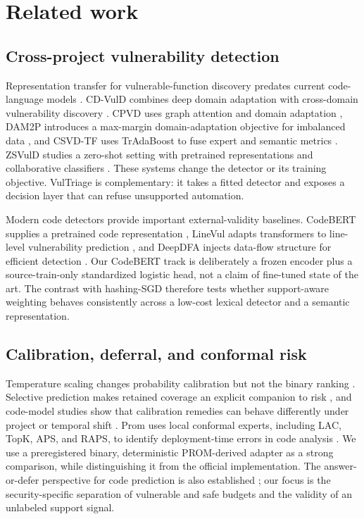 \documentclass[research]{fcs}
\newcommand{\method}{VulTriage\xspace}
\begin{document}
\section{Related work}

\subsection{Cross-project vulnerability detection}

Representation transfer for vulnerable-function discovery predates current code-language models \cite{lin2018transfer}. CD-VulD combines deep domain adaptation with cross-domain vulnerability discovery \cite{liu2022cdvuld}. CPVD uses graph attention and domain adaptation \cite{zhang2023cpvd}, DAM2P introduces a max-margin domain-adaptation objective for imbalanced data \cite{nguyen2024dam2p}, and CSVD-TF uses TrAdaBoost to fuse expert and semantic metrics \cite{cai2024csvdtf}. ZSVulD studies a zero-shot setting with pretrained representations and collaborative classifiers \cite{haque2026zsvuld}. These systems change the detector or its training objective. \method is complementary: it takes a fitted detector and exposes a decision layer that can refuse unsupported automation.

Modern code detectors provide important external-validity baselines. CodeBERT supplies a pretrained code representation \cite{feng2020codebert}, LineVul adapts transformers to line-level vulnerability prediction \cite{fu2022linevul}, and DeepDFA injects data-flow structure for efficient detection \cite{steenhoek2024deepdfa}. Our CodeBERT track is deliberately a frozen encoder plus a source-train-only standardized logistic head, not a claim of fine-tuned state of the art. The contrast with hashing-SGD therefore tests whether support-aware weighting behaves consistently across a low-cost lexical detector and a semantic representation.

\subsection{Calibration, deferral, and conformal risk}

Temperature scaling changes probability calibration but not the binary ranking \cite{guo2017calibration}. Selective prediction makes retained coverage an explicit companion to risk \cite{geifman2019selectivenet}, and code-model studies show that calibration remedies can behave differently under project or temporal shift \cite{zhou2024calibration,li2021shift}. Prom uses local conformal experts, including LAC, TopK, APS, and RAPS, to identify deployment-time errors in code analysis \cite{wang2025prom}. We use a preregistered binary, deterministic PROM-derived adapter as a strong comparison, while distinguishing it from the official implementation. The answer-or-defer perspective for code prediction is also established \cite{rathnasuriya2026defer}; our focus is the security-specific separation of vulnerable and safe budgets and the validity of an unlabeled support signal.
\end{document}
